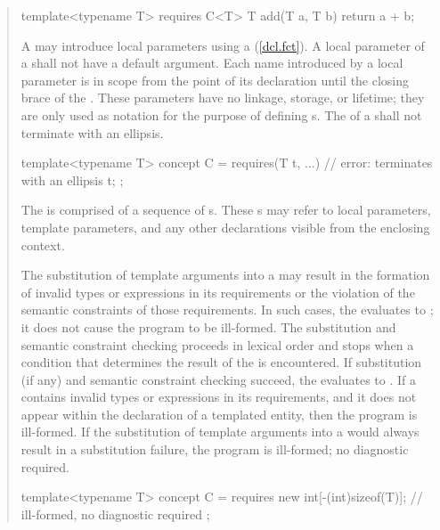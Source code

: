 \begin{quote}
\begin{addedblock}
\begin{codeblock}
template<typename T> requires C<T> 
  T add(T a, T b) { return a + b; }
\end{codeblock}
\exitnote

\pnum
A  may introduce local parameters using a
(\ref{dcl.fct}). 
%
A local parameter of a  shall not have a 
default argument.
%
Each name introduced by a local parameter is in scope from the point
of its declaration until the closing brace of the
.
%
These parameters have no linkage, storage, or lifetime; they are only used
as notation for the purpose of defining s.
%
The  of a 
 shall
not terminate with an ellipsis.
\enterexample
\begin{codeblock}
template<typename T>
  concept C = requires(T t, ...) { // error: terminates with an ellipsis
    t; 
  };
\end{codeblock}
\exitexample

\pnum
The  is comprised of 
a sequence of s.
%
These s may refer to local 
parameters, template parameters, and any other declarations visible from the 
enclosing context. 

\pnum
The substitution of template arguments into a  
may result in the formation of invalid types or expressions in its
requirements or the violation of the semantic constraints of those requirements.
In such cases, the  evaluates to ;
it does not cause the program to be ill-formed.
The substitution and semantic constraint checking
proceeds in lexical order and stops when a condition that
determines the result of the  is encountered.
If substitution (if any) and semantic constraint checking succeed,
the  evaluates to .
\enternote
If a  contains invalid types or expressions in
its requirements, and it does not appear within the declaration of a templated
entity, then the program is ill-formed.
\exitnote
If the substitution of template arguments into a  
would always result in a substitution failure, the program is ill-formed; 
no diagnostic required.
%
\enterexample
\begin{codeblock}
template<typename T> concept C =
  requires {
    new int[-(int)sizeof(T)]; // ill-formed, no diagnostic required
  };
\end{codeblock}
\exitexample



\end{addedblock}
\end{quote}
